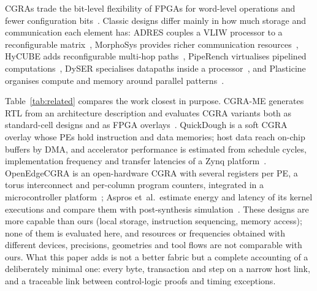 CGRAs trade the bit-level flexibility of FPGAs for word-level operations and
fewer configuration bits~\cite{hartenstein,cgra-survey,podobas-survey}.
Classic designs differ mainly in how much storage and communication each
element has: ADRES couples a VLIW processor to a reconfigurable
matrix~\cite{adres}, MorphoSys provides richer communication
resources~\cite{morphosys}, HyCUBE adds reconfigurable multi-hop
paths~\cite{hycube}, PipeRench virtualises pipelined
computations~\cite{piperench}, DySER specialises datapaths inside a
processor~\cite{dyser}, and Plasticine organises compute and memory around
parallel patterns~\cite{plasticine}.

Table~\ref{tab:related} compares the work closest in purpose. CGRA-ME
generates RTL from an architecture description and evaluates CGRA variants
both as standard-cell designs and as FPGA overlays~\cite{cgra-me,cgra-me-ispd}.
QuickDough is a soft CGRA overlay whose PEs hold instruction and data
memories; host data reach on-chip buffers by DMA, and accelerator
performance is estimated from schedule cycles, implementation frequency and
transfer latencies of a Zynq platform~\cite{quickdough}. OpenEdgeCGRA is an
open-hardware CGRA with several registers per PE, a torus interconnect and
per-column program counters, integrated in a microcontroller
platform~\cite{openedgecgra}; Aspros et~al.\ estimate energy and latency of
its kernel executions and compare them with post-synthesis
simulation~\cite{aspros-cgra}. These designs are more capable than ours
(local storage, instruction sequencing, memory access); none of them is
evaluated here, and resources or frequencies obtained with different
devices, precisions, geometries and tool flows are not comparable with ours.
What this paper adds is not a better fabric but a complete accounting of a
deliberately minimal one: every byte, transaction and step on a narrow host
link, and a traceable link between control-logic proofs and timing
exceptions.


